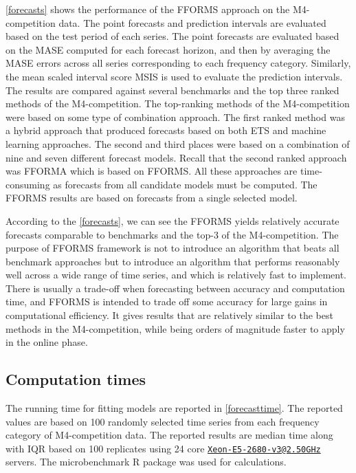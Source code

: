 \documentclass[11pt,a4paper,]{article}
\begin{document}
\autoref{forecasts} shows the performance of the FFORMS approach on the M4-competition data. The point forecasts and prediction intervals are evaluated based on the test period of each series. The point forecasts are evaluated based on the MASE computed for each forecast horizon, and then by averaging the MASE errors across all series corresponding to each frequency category. Similarly, the mean scaled interval score MSIS \autocite{makridakis2019m4} is used to evaluate the prediction intervals. The results are compared against several benchmarks and the top three ranked methods of the M4-competition. The top-ranking methods of the M4-competition were based on some type of combination approach.
The first ranked method was a hybrid approach that produced forecasts based on both ETS and machine learning approaches. The second and third places were based on a combination of nine and seven different forecast models. Recall that the second ranked approach was FFORMA which is based on FFORMS. All these approaches are time-consuming as forecasts from all candidate models must be computed. The FFORMS results are based on forecasts from a single selected model.

According to the \autoref{forecasts}, we can see the FFORMS yields relatively accurate forecasts comparable to benchmarks and the top-3 of the M4-competition. The purpose of FFORMS framework is not to introduce an algorithm that beats all benchmark approaches but to introduce an algorithm that performs reasonably well across a wide range of time series, and which is relatively fast to implement. There is usually a trade-off when forecasting between accuracy and computation time, and FFORMS is intended to trade off some accuracy for large gains in computational efficiency. It gives results that are relatively similar to the best methods in the M4-competition, while being orders of magnitude faster to apply in the online phase.

\hypertarget{computation-times}{%
\subsection{Computation times}\label{computation-times}}

The running time for fitting models are reported in \autoref{forecasttime}. The reported values are based on 100 randomly selected time series from each frequency category of M4-competition data. The reported results are median time along with IQR based on 100 replicates using 24 core \href{mailto:Xeon-E5-2680-v3@2.50GHz}{\nolinkurl{Xeon-E5-2680-v3@2.50GHz}} servers. The microbenchmark \autocite{microbench} R package was used for calculations.
\end{document}
